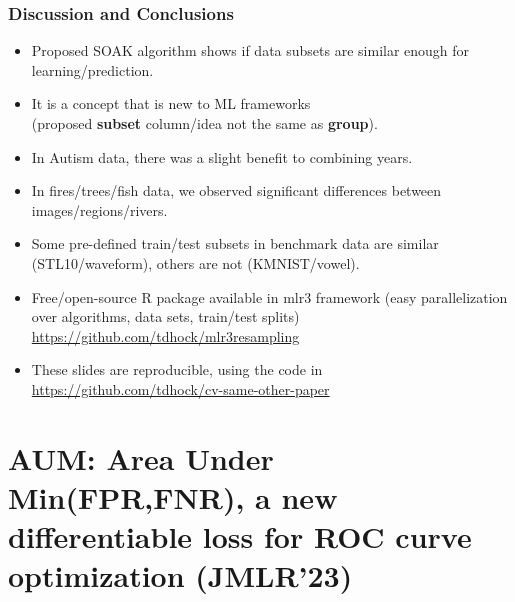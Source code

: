 \documentclass[t]{beamer}
\begin{document}
\begin{frame}
  \frametitle{Discussion and Conclusions}
  \begin{itemize}
  \item Proposed SOAK algorithm shows if
    data subsets are similar enough for learning/prediction.
  \item It is a concept that is new to ML frameworks\\
    (proposed \textbf{subset} column/idea not the same as \textbf{group}).
  \item In Autism data, there was a slight benefit to combining years.
  \item In fires/trees/fish data, we observed
    significant differences between images/regions/rivers.
  \item Some pre-defined train/test subsets in benchmark data
    are similar (STL10/waveform), others are not (KMNIST/vowel).
  \item Free/open-source R package available in mlr3 framework (easy
    parallelization over algorithms, data sets, train/test splits)
    \url{https://github.com/tdhock/mlr3resampling}
  \item These slides are reproducible, using the code in \url{https://github.com/tdhock/cv-same-other-paper}
  \end{itemize}
\end{frame}


\section{AUM: Area Under Min(FPR,FNR), a new differentiable loss for ROC curve optimization (JMLR'23)} 
\end{document}
